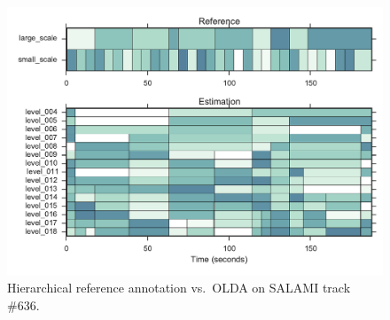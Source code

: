 \documentclass{article}
\def\shag{\ensuremath{\mathpzc{T}}}
\begin{document}
\begin{figure}[t]
  \centering
   \includegraphics[width=\columnwidth]{figs/SALAMI-OLDA}
  \caption{Hierarchical reference annotation vs.\ OLDA on SALAMI track \#636.}
  \label{fig:SALAMI-OLDA}
\end{figure}
\end{document}
